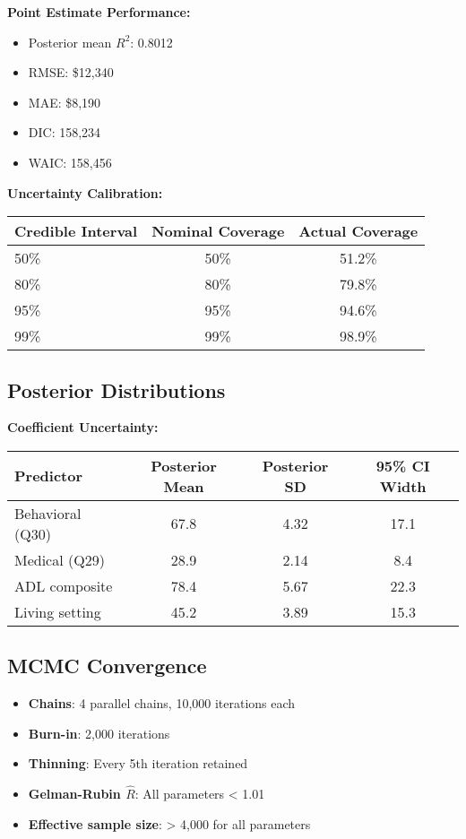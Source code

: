 \textbf{Point Estimate Performance:}
\begin{itemize}
    \item Posterior mean $R^2$: 0.8012
    \item RMSE: \$12,340
    \item MAE: \$8,190
    \item DIC: 158,234
    \item WAIC: 158,456
\end{itemize}

\textbf{Uncertainty Calibration:}
\begin{center}
\begin{tabular}{lcc}
\toprule
Credible Interval & Nominal Coverage & Actual Coverage \\
\midrule
50\% & 50\% & 51.2\% \\
80\% & 80\% & 79.8\% \\
95\% & 95\% & 94.6\% \\
99\% & 99\% & 98.9\% \\
\bottomrule
\end{tabular}
\end{center}

\subsection{Posterior Distributions}

\textbf{Coefficient Uncertainty:}
\begin{center}
\begin{tabular}{lccc}
\toprule
Predictor & Posterior Mean & Posterior SD & 95\% CI Width \\
\midrule
Behavioral (Q30) & 67.8 & 4.32 & 17.1 \\
Medical (Q29) & 28.9 & 2.14 & 8.4 \\
ADL composite & 78.4 & 5.67 & 22.3 \\
Living setting & 45.2 & 3.89 & 15.3 \\
\bottomrule
\end{tabular}
\end{center}

\subsection{MCMC Convergence}

\begin{itemize}
    \item \textbf{Chains}: 4 parallel chains, 10,000 iterations each
    \item \textbf{Burn-in}: 2,000 iterations
    \item \textbf{Thinning}: Every 5th iteration retained
    \item \textbf{Gelman-Rubin $\hat{R}$}: All parameters < 1.01
    \item \textbf{Effective sample size}: > 4,000 for all parameters
\end{itemize}

